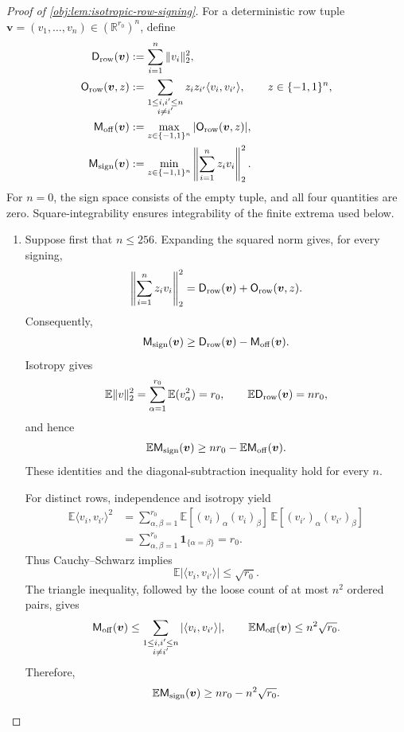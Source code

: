 \documentclass[11pt]{article}
\begin{document}
\begin{proof}[Proof of \cref{obj:lem:isotropic-row-signing}]
For a deterministic row tuple \(\boldsymbol v=(v_1,\ldots,v_n)\in(\mathbb R^{r_0})^n\), define
\[
\begin{aligned}
\mathsf D_{\rm row}(\boldsymbol v)
&:=\sum_{i=1}^n\|v_i\|_2^2,\\
\mathsf O_{\rm row}(\boldsymbol v,z)
&:=\sum_{\substack{1\leq i,i'\leq n\\i\ne i'}}
z_i z_{i'}\langle v_i,v_{i'}\rangle,
\qquad z\in\{-1,1\}^n,\\
\mathsf M_{\rm off}(\boldsymbol v)
&:=\max_{z\in\{-1,1\}^n}
|\mathsf O_{\rm row}(\boldsymbol v,z)|,\\
\mathsf M_{\rm sign}(\boldsymbol v)
&:=\min_{z\in\{-1,1\}^n}
\left\|\sum_{i=1}^n z_i v_i\right\|_2^2.
\end{aligned}
\]
For \(n=0\), the sign space consists of the empty tuple, and all four quantities are zero. Square-integrability ensures integrability of the finite extrema used below.

\begin{enumerate}
\item Suppose first that \(n\leq256\).
Expanding the squared norm gives, for every signing,
\[
\left\|\sum_{i=1}^n z_i v_i\right\|_2^2
=\mathsf D_{\rm row}(\boldsymbol v)
+\mathsf O_{\rm row}(\boldsymbol v,z).
\]
Consequently,
\[
\mathsf M_{\rm sign}(\boldsymbol v)
\geq\mathsf D_{\rm row}(\boldsymbol v)
-\mathsf M_{\rm off}(\boldsymbol v).
\]
Isotropy gives
\[
\mathbb E\|v\|_2^2
=\sum_{\alpha=1}^{r_0}\mathbb E(v_\alpha^2)=r_0,
\qquad
\mathbb E\mathsf D_{\rm row}(\boldsymbol v)=nr_0,
\]
and hence
\[
\mathbb E\mathsf M_{\rm sign}(\boldsymbol v)
\geq nr_0-\mathbb E\mathsf M_{\rm off}(\boldsymbol v).
\]
These identities and the diagonal-subtraction inequality hold for every \(n\).

For distinct rows, independence and isotropy yield
\[
\begin{aligned}
\mathbb E\langle v_i,v_{i'}\rangle^2
&=\sum_{\alpha,\beta=1}^{r_0}
\mathbb E[(v_i)_\alpha(v_i)_\beta]\,
\mathbb E[(v_{i'})_\alpha(v_{i'})_\beta]\\
&=\sum_{\alpha,\beta=1}^{r_0}\mathbf 1_{\{\alpha=\beta\}}
=r_0.
\end{aligned}
\]
Thus Cauchy--Schwarz implies
\[
\mathbb E|\langle v_i,v_{i'}\rangle|
\leq\sqrt{r_0}.
\]
The triangle inequality, followed by the loose count of at most \(n^2\) ordered pairs, gives
\[
\mathsf M_{\rm off}(\boldsymbol v)
\leq\sum_{\substack{1\leq i,i'\leq n\\i\ne i'}}
|\langle v_i,v_{i'}\rangle|,
\qquad
\mathbb E\mathsf M_{\rm off}(\boldsymbol v)
\leq n^2\sqrt{r_0}.
\]
Therefore,
\[
\mathbb E\mathsf M_{\rm sign}(\boldsymbol v)
\geq nr_0-n^2\sqrt{r_0}.
\]


\end{enumerate}
\end{proof}
\end{document}
